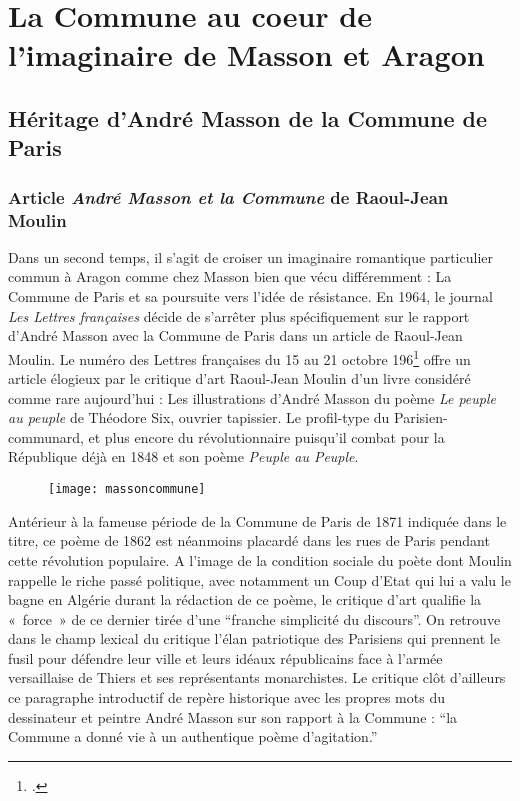 \chapter{La Commune au coeur de l'imaginaire de Masson et Aragon}

\section{Héritage d’André Masson de la Commune de Paris}

\subsection{Article \emph{André Masson et la Commune} de Raoul-Jean Moulin }

Dans un second temps, il s’agit de croiser un imaginaire romantique particulier commun à Aragon comme chez Masson bien que vécu différemment : La Commune de Paris et sa poursuite vers l’idée de résistance. En 1964, le journal \emph{Les Lettres françaises} décide de s’arrêter plus spécifiquement sur le rapport d’André Masson avec la Commune de Paris dans un article de Raoul-Jean Moulin. Le numéro des Lettres françaises du 15 au 21 octobre 196\footcite{commune} offre un article élogieux par le critique d’art Raoul-Jean Moulin d’un livre considéré comme rare aujourd’hui : Les illustrations d’André Masson du poème \emph{Le peuple au peuple} de Théodore Six, ouvrier tapissier. Le profil-type du Parisien- communard, et plus encore du révolutionnaire puisqu’il combat pour la République déjà en 1848 et son poème \emph{Peuple au Peuple}. 

\begin{figure}[H]
   \centering
   \texttt{[image: massoncommune]}
	\caption{\cite{commune}}\label{articlemoulin}
\end{figure}


 Antérieur à la fameuse période de la Commune de Paris de 1871 indiquée dans le titre, ce poème de 1862 est néanmoins placardé dans les rues de Paris pendant cette révolution populaire. A l’image de la condition sociale du poète dont Moulin rappelle le riche passé politique, avec notamment un Coup d’Etat qui lui a valu le bagne en Algérie durant la rédaction de ce poème, le critique d’art qualifie la « force » de ce dernier tirée d’une \enquote{franche simplicité du discours}. On retrouve dans le champ lexical du critique l’élan patriotique des Parisiens qui prennent le fusil pour défendre leur ville et leurs idéaux républicains face à l’armée versaillaise de Thiers et ses représentants monarchistes. Le critique clôt d’ailleurs ce paragraphe introductif de repère historique avec les propres mots du dessinateur et peintre André Masson sur son rapport à la Commune : \enquote{la Commune a donné vie à un authentique poème d’agitation.}

